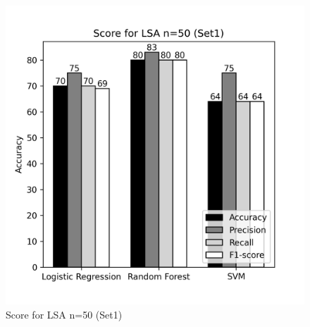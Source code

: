\documentclass[12pt]{report}
\begin{document}
\begin{figure}[!htb]
\begin{minipage}{0.48\textwidth}
                  \includegraphics[scale=0.55]{plots/Score for LSA n=50 (Set1).png}
                  \caption{Score for LSA n=50 (Set1)}\label{Fig:typo2}
                \end{minipage}
             \end{figure}
\end{document}

